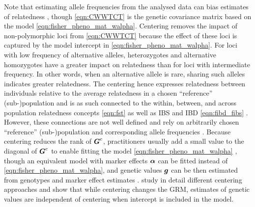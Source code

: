 %
Note that estimating allele frequencies from the analysed data can bias
estimates of relatedness \citep{ritland1996estimators, astle2009population, toro2011note, ackerman2017estimating, weir2017unified},
though \eqref{eqn:CWWTCT} is the genetic covariance matrix based on the
model \eqref{eqn:fisher_pheno_mat_walpha}.
%
Centering removes the impact of non-polymorphic loci from
\eqref{eqn:CWWTCT} because the effect of these loci is captured by the
model intercept in \eqref{eqn:fisher_pheno_mat_walpha}.
%
For loci with low frequency of alternative alleles, heterozygotes and alternative
homozygotes have a greater impact on relatedness than for loci with intermediate
frequency.
%
In other words, when an alternative allele is rare, sharing such alleles indicates
greater relatedness.
%
The centering hence expresses relatedness between individuals relative to the
average relatedness in a chosen ``reference'' (sub-)population and is as such
connected to the within, between, and across population relatedness concepts
\eqref{eqn:fst} as well as IBS and IBD \eqref{eqn:fibd_fibs}
\citep{wright1949genetical, jacquard1975inbreeding, powell2010reconciling,
legarra2015ancestral, legarra2016comparing}.
%
However, these connections are not well defined and rely on arbitrarily
chosen ``reference'' (sub-)population and corresponding allele frequencies
\citep{legarra2016comparing, powell2010reconciling, speed2015relatedness}.
%
Because centering reduces the rank of $\boldsymbol{G}^{c}$, practitioners usually
add a small value to the diagonal of $\boldsymbol{G}^{c}$ to enable fitting the model 
\eqref{eqn:fisher_pheno_mat_walpha} \citep{vanraden2008efficient},
though an equivalent model with marker effects $\boldsymbol{\alpha}$ can be fitted
instead of \eqref{eqn:fisher_pheno_mat_walpha},
and genetic values $\boldsymbol{g}$ can be then estimated from genotypes
and marker effect estimates \citep{stranden2009derivation}.
%
\cite{stranden2011allele} study in detail different centering approaches
and show that while centering changes the GRM, estimates of genetic values
are independent of centering when intercept is included in the model.
%

